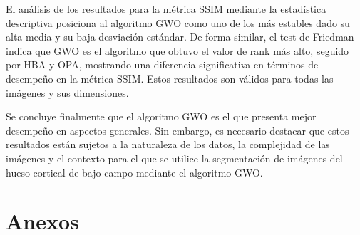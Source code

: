 \documentclass[conference]{IEEEtran}
\begin{document}
\noindent El análisis de los resultados para la métrica SSIM mediante la estadística descriptiva posiciona al algoritmo GWO como uno de los más estables dado su alta media y su baja desviación estándar. De forma similar, el test de Friedman indica que GWO es el algoritmo que obtuvo el valor de rank más alto, seguido por HBA y OPA, mostrando una diferencia significativa en términos de desempeño en la métrica SSIM. Estos resultados son válidos para todas las imágenes y sus dimensiones.

\noindent Se concluye finalmente que el algoritmo GWO es el que presenta mejor desempeño en aspectos generales. Sin embargo, es necesario destacar que estos resultados están sujetos a la naturaleza de los datos, la complejidad de las imágenes y el contexto para el que se utilice la segmentación de imágenes del hueso cortical de bajo campo mediante el algoritmo GWO.






 \clearpage


\clearpage
\section{Anexos}
\end{document}
